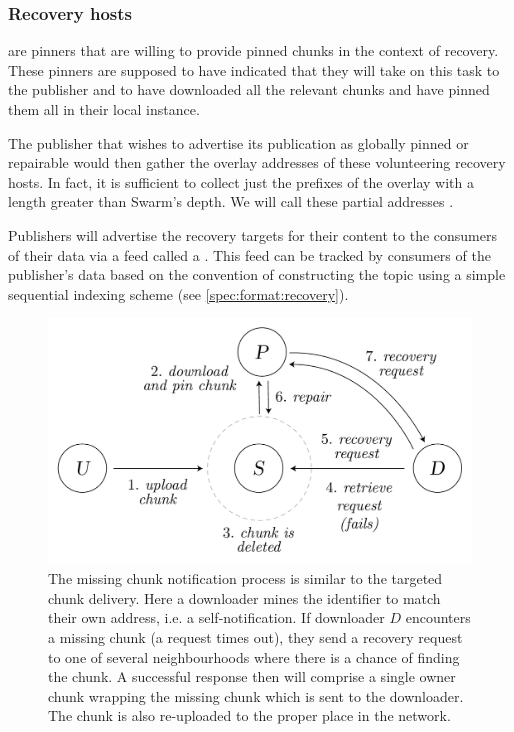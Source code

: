 \subsubsection{Recovery hosts}

 are pinners that are willing to provide pinned chunks in the context of recovery. These pinners are supposed to have indicated that they will take on this task to the publisher and to have downloaded all the relevant chunks and have pinned them all in their local instance. 

The publisher that wishes to advertise its publication as globally pinned or repairable would then gather the overlay addresses of these volunteering recovery hosts. In fact, it is sufficient to collect just the prefixes of the overlay with a length greater than Swarm's depth. We will call these partial addresses .

Publishers will advertise the recovery targets for their content to the consumers of their data via a feed called a . This feed can be tracked by consumers of the publisher's data based on the convention of constructing the topic using a simple sequential indexing scheme (see \ref{spec:format:recovery}). 

\begin{figure}[htbp]
\centering
\includegraphics[width=.8\textwidth]{fig/missing-chunk-notification.pdf} \caption[Missing chunk notification process \statusgreen]{The missing chunk notification process is similar to the targeted chunk delivery. Here a downloader mines the identifier to match their own address, i.e. a self-notification. If downloader $D$ encounters a missing chunk (a request times out), they send a recovery request to one of several neighbourhoods where there is a chance of finding the chunk. A successful response then will comprise a single owner chunk wrapping the missing chunk which is sent to the downloader. The chunk is also re-uploaded to the proper place in the network.}
\label{fig:missing-chunk-notification}
\end{figure}

